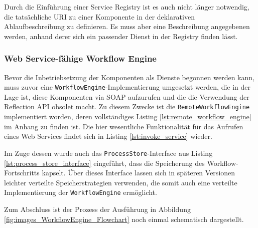   

  Durch die Einführung einer Service Registry ist es auch nicht länger notwendig, die tatsäch\-liche URI zu einer Komponente in der deklarativen Ablaufbeschreibung zu definieren. Es muss aber eine Beschreibung angegebenen werden, anhand derer sich ein passender Dienst in der Registry finden lässt.
  

\subsubsection{Web Service-fähige Workflow Engine} %
\label{ssub:web_service_faehige_workflow_engine}

  Bevor die Inbetriebsetzung der Komponenten als Dienste begonnen werden kann, muss zuvor eine \verb!WorkflowEngine!-Implementierung umgesetzt werden, die in der Lage ist, diese Komponenten via SOAP aufzurufen und die die Verwendung der Reflection API obsolet macht. Zu diesem Zwecke ist die \verb!RemoteWorkflowEngine! implementiert worden, deren vollständiges Listing \ref{lst:remote_workflow_engine} im Anhang zu finden ist. Die hier wesentliche Funktionalität für das Aufrufen eines Web Services findet sich in Listing \ref{lst:invoke_service} wieder.
  
  
  
  Im Zuge dessen wurde auch das \verb!ProcessStore!-Interface aus Listing \ref{lst:process_store_interface} eingeführt, dass die Speicherung des Workflow-Fortschritts kapselt. Über dieses Interface lassen sich in späteren Versionen leichter verteilte Speicherstrategien verwenden, die somit auch eine verteilte Implementierung der \verb!WorkflowEngine! ermöglicht.
  
  
  
  Zum Abschluss ist der Prozess der Ausführung in Abbildung \ref{fig:images_WorkflowEngine_Flowchart} noch einmal schematisch dargestellt.
  
